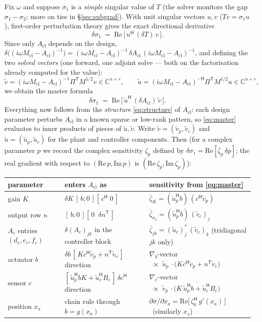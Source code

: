 \documentclass[11pt,a4paper]{article}
\newcommand{\C}{\mathbb{C}}
\newcommand{\Mcl}{M_{\mathrm{cl}}}
\newcommand{\Acl}{A_{\mathrm{cl}}}
\newcommand{\hp}{^{\mathsf H}}
\newcommand{\tp}{^{\mathsf T}}   %
\begin{document}
{Fix $\omega$ and suppose $\sigma_1$ is a \emph{simple} singular value of $T$ (the solver
monitors the gap $\sigma_1-\sigma_2$; more on ties in \S\ref{sec:subgrad}).  With unit
singular vectors $u,v$ ($Tv=\sigma_1 u$), first-order perturbation theory gives the exact
directional derivative
\[
\delta\sigma_1 \;=\; \mathrm{Re}\,\bigl[\,u\hp\,(\delta T)\,v\,\bigr].
\]
Since only $\Acl$ depends on the design, $\delta\bigl((i\omega\Mcl-\Acl)^{-1}\bigr)
=(i\omega\Mcl-\Acl)^{-1}\,\delta\Acl\,(i\omega\Mcl-\Acl)^{-1}$, and defining the two
\emph{solved vectors} (one forward, one adjoint solve --- both on the factorisation
already computed for the value):
\[
\tilde v=(i\omega\Mcl-\Acl)^{-1}\Pi\tp M^{1/2}v \in\C^{n+r},
\qquad
\tilde u=(i\omega\Mcl-\Acl)^{-\mathsf H}\Pi\tp M^{1/2}u \in\C^{n+r},
\]
we obtain the master formula
\begin{equation}
\boxed{\;\delta\sigma_1 \;=\; \mathrm{Re}\,\bigl[\,\tilde u\hp\,(\delta \Acl)\,\tilde v\,\bigr].\;}
\label{eq:master}
\end{equation}
Everything now follows from the \emph{structure} \eqref{eq:structure} of $\Acl$: each
design parameter perturbs $\Acl$ in a known sparse or low-rank pattern, so
\eqref{eq:master} evaluates to inner products of pieces of $\tilde u,\tilde v$.  Write
$\tilde v=(\tilde v_p,\tilde v_c)$ and $\tilde u=(\tilde u_p,\tilde u_c)$ for the plant
and controller components.  Then (for a complex parameter $p$ we record the complex
sensitivity $\zeta_p$ defined by $\delta\sigma_1=\mathrm{Re}[\bar\zeta_p\,\delta p]$; the
real gradient with respect to $(\mathrm{Re}\,p,\mathrm{Im}\,p)$ is
$(\mathrm{Re}\,\zeta_p,\mathrm{Im}\,\zeta_p)$):

\begin{center}
\small
\begin{tabular}{lll}
\toprule
parameter & enters $\Acl$ as & sensitivity from \eqref{eq:master} \\
\midrule
gain $K$ & $\delta K\,[\,b;0\,][\,c\hp\;0\,]$ &
 $\bar\zeta_K=(\tilde u_p\hp b)\,(c\hp\tilde v_p)$ \\[2pt]
output row $n$ & $[\,b;0\,][\,0\;\;\delta n\tp\,]$ &
 $\bar\zeta_{n_j}=(\tilde u_p\hp b)\,(\tilde v_c)_j$ \\[2pt]
$A_c$ entries $(d_c,e_c,f_c)$ & $\delta(A_c)_{jk}$ in the controller block &
 $\bar\zeta_{jk}=(\tilde u_c)^*_j\,(\tilde v_c)_k$ \quad (tridiagonal $jk$ only) \\[2pt]
actuator $b$ & $\delta b\,[\,Kc\hp\tilde v_p + n\tp\tilde v_c\,]$ direction &
 $\nabla_b$-vector $\;\propto\; \overline{\tilde u_p}\,\cdot
 \bigl(Kc\hp\tilde v_p + n\tp\tilde v_c\bigr)$ \\[2pt]
sensor $c$ & $[\,\tilde u_p\hp bK + \tilde u_c\hp B_c\,]\,\delta c\hp$ direction &
 $\nabla_c$-vector $\;\propto\; \tilde v_p\,\cdot
 \overline{\bigl(K\,\tilde u_p\hp b + \tilde u_c\hp B_c\bigr)}$ \\[2pt]
position $x_a$ & chain rule through $b=g(x_a)$ &
 $\partial\sigma/\partial x_a = \mathrm{Re}\bigl[\,\zeta_b\hp\, g'(x_a)\,\bigr]$
 \ (similarly $x_s$) \\
\bottomrule
\end{tabular}
\end{center}

}
\end{document}
